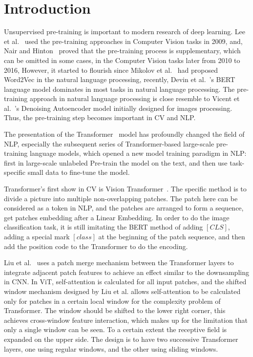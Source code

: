 \documentclass[runningheads]{llncs}
\begin{document}
\section{Introduction}

  \par Unsupervised pre-training is important to modern research of deep learning.
  Lee et al.~\cite{lee2009convolutional} used the pre-training approaches in Computer Vision tasks in 2009,
  and, Nair and Hinton~\cite{nair2010rectified} proved that the pre-training process is supplementary, which can be omitted in some cases, in the Computer Vision tasks later from 2010 to 2016,
  However, it started to flourish since Mikolov et al.~\cite{mikolov2013distributed} had proposed Word2Vec in the natural language processing,
  recently, Devin et al.~\cite{devlin2019bert}'s BERT language model dominates in most tasks in natural language processing.
  The pre-training approach in natural language processing is close resemble to Vicent et al.~\cite{vincent2008extracting}'s Denoising Autoencoder model initially designed for images processing.
  Thus, the pre-training step becomes important in CV and NLP.

  \par The presentation of the Transformer~\cite{vaswani2017attention} model has profoundly changed the field of NLP,
especially the subsequent series of Transformer-based large-scale pre-training language models,
which opened a new model training paradigm in NLP: first in large-scale unlabeled Pre-train the model on the text,
and then use task-specific small data to fine-tune the model.

  \par Transformer's first show in CV is Vision Transformer~\cite{dosovitskiy2020image}.
The specific method is to divide a picture into multiple non-overlapping patches.
The patch here can be considered as a token in NLP, and the patches are arranged to form a sequence, get patches embedding after a Linear Embedding.
In order to do the image classification task, it is still imitating the BERT method of adding $[CLS]$, adding a special mark $[class]$ at the beginning of the patch sequence, and then add the position code to the Transformer to do the encoding.

  \par Liu et al.~\cite{liu2021swin} uses a patch merge mechanism between the Transformer layers to integrate adjacent patch features to achieve an effect similar to the downsampling in CNN.
In ViT, self-attention is calculated for all input patches, and the shifted window mechanism designed by Liu et al. allows self-attention to be calculated only for patches in a certain local window for the complexity problem of Transformer.
The window should be shifted to the lower right corner, this achieves cross-window feature interaction, which makes up for the limitation that only a single window can be seen.
To a certain extent the receptive field is expanded on the upper side. The design is to have two successive Transformer layers, one using regular windows, and the other using sliding windows.
\end{document}

